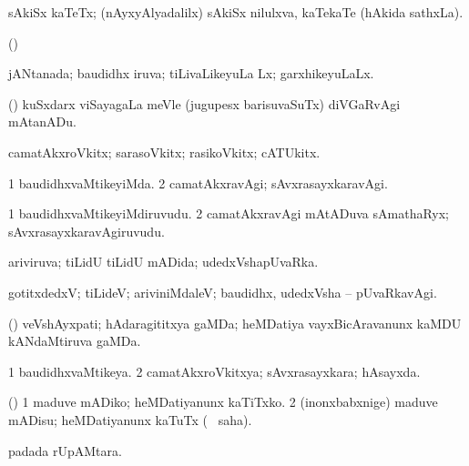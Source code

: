 {{{{{{\bentry
{} 
\gl{\nA}
\expl{}
\bmng
sAkiSx kaTeTx; (nAyxyAlyadalilx) sAkiSx nilulxva, kaTekaTe (hAkida sathxLa). 
\emng
\eentry

\bentry
{} 
\gl{\nA}
\expl{}
\bmng
(\ame)  
\emng
\eentry

\bentry
{} 
\gl{\gu}
\expl{}
\bmng
jANtanada; baudidhx iruva; tiLivaLikeyuLa Lx; garxhikeyuLaLx. 
\emng
\eentry

\bentry
{} 
\gl{\kirx}
\expl{}
\bmng
(\AmA) kuSxdarx viSayagaLa meVle (jugupesx barisuvaSuTx) diVGaRvAgi mAtanADu. 
\emng
\eentry

\bentry
{} 
\gl{\nA}
\expl{}
\bmng
camatAkxroVkitx; sarasoVkitx; rasikoVkitx; cATUkitx. 
\emng
\eentry

\bentry
{} 
\gl{\kirxvi}
\expl{}
\bmng
\bnum
\num{1} baudidhxvaMtikeyiMda. 
\num{2} camatAkxravAgi; sAvxrasayxkaravAgi. 
\enum
\emng
\eentry

\bentry
{} 
\gl{\nA}
\expl{}
\bmng
\bnum
\num{1} baudidhxvaMtikeyiMdiruvudu. 
\num{2} camatAkxravAgi mAtADuva sAmathaRyx; sAvxrasayxkaravAgiruvudu. 
\enum
\emng
\eentry

\bentry
{} 
\gl{\gu}
\expl{}
\bmng
ariviruva; tiLidU tiLidU mADida; udedxVshapUvaRka. 
\emng
\eentry

\bentry
{} 
\gl{\kirxvi}
\expl{}
\bmng
gotitxdedxV; tiLideV; ariviniMdaleV; baudidhx, udedxVsha -- pUvaRkavAgi. 
\emng
\eentry

\bentry
{} 
\gl{\nA}
\expl{}
\bmng
(\pArxparx) veVshAyxpati; hAdaragititxya gaMDa; heMDatiya vayxBicAravanunx kaMDU kANdaMtiruva gaMDa. 
\emng
\eentry

\bentry
{} 
\gl{\gu}
\bmng
\bnum
\num{1} baudidhxvaMtikeya. 
\num{2} camatAkxroVkitxya; sAvxrasayxkara; hAsayxda. 
\enum
\emng
\eentry

\bentry
{} 
\gl{\akirx}
\expl{}
\bmng
(\pArxparx) 
\bnum
\num{1} maduve mADiko; heMDatiyanunx kaTiTxko. 
\num{2} (inonxbabxnige) maduve mADisu; heMDatiyanunx kaTuTx ( \akirx\ saha). 
\enum
\emng
\eentry

\bentry
{} 
\gl{\nA}
\expl{}
\bmng
{} padada rUpAMtara. 
\emng
\eentry

}}}}}}
